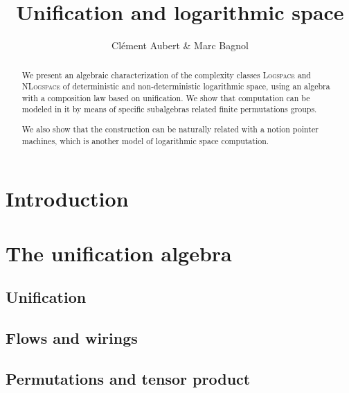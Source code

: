 

\title{Unification and logarithmic space}
\author{Clément Aubert \& Marc Bagnol}

\maketitle







\begin{abstract}
	We present an algebraic characterization of the complexity classes \textsc{Logspace} and \textsc{NLogspace} of deterministic and non-deterministic logarithmic space, using an algebra with a composition law based on unification. We show that computation can be modeled in it by means of specific subalgebras related finite permutations groups.

We also show that the construction can be naturally related with a notion pointer machines, which is another model of logarithmic space computation.
\end{abstract}


\section*{Introduction}


\section{The unification algebra}\label{sec:unification}
	\subsection{Unification}
	
	\subsection{Flows and wirings}
	
	\subsection{Permutations and tensor product}\label{permutation}
	

